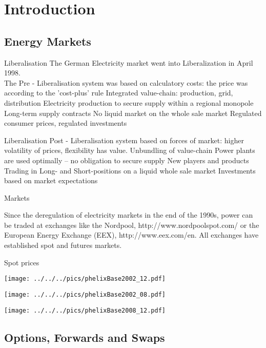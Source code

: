 

\section{Introduction}
\subsection{Energy Markets}

Liberalisation
	The German Electricity market went into Liberalization in April 1998.\\
	The Pre - Liberalisation system was based on calculatory costs: the price was according to the 'cost-plus' rule
		Integrated value-chain: production, grid, distribution
		Electricity production to secure supply within a regional monopole
		Long-term supply contracts
		No liquid market on the whole sale market
		Regulated consumer prices, regulated investments


Liberalisation
	Post - Liberalisation system based on forces of market: higher volatility of prices, flexibility has value.
		Unbundling of value-chain
		Power plants are used optimally -- no obligation to secure supply
		New players and products
		Trading in Long- and Short-positions on a liquid whole sale market
		Investments based on market expectations


Markets

Since the deregulation of electricity markets in the end of the
1990s, power can be traded at exchanges like the Nordpool, http://www.nordpoolspot.com/  or the
European Energy Exchange (EEX), http://www.eex.com/en. All exchanges have established
spot and futures markets.


Spot prices
\begin{center}
\texttt{[image: ../../../pics/phelixBase2002\_12.pdf]}
\end{center}

\begin{center}
\texttt{[image: ../../../pics/phelixBase2002\_08.pdf]}
\end{center}

\begin{center}
\texttt{[image: ../../../pics/phelixBase2008\_12.pdf]}
\end{center}


\subsection{Options, Forwards and Swaps}


